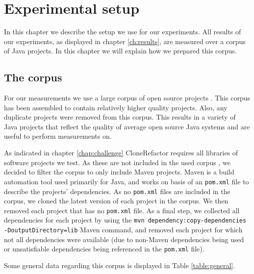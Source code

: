 \chapter{Experimental setup}
In this chapter we describe the setup we use for our experiments. All results of our experiments, as displayed in chapter \ref{ch:results}, are measured over a corpus of Java projects. In this chapter we will explain how we prepared this corpus.

\section{The corpus}\label{chap:corpus}
For our measurements we use a large corpus of open source projects \cite{githubCorpus2013}. This corpus has been assembled to contain relatively higher quality projects. Also, any duplicate projects were removed from this corpus. This results in a variety of Java projects that reflect the quality of average open source Java systems and are useful to perform measurements on.

As indicated in chapter \ref{chap:challenge} CloneRefactor requires all libraries of software projects we test. As these are not included in the used corpus \cite{githubCorpus2013}, we decided to filter the corpus to only include Maven projects. Maven is a build automation tool used primarily for Java, and works on basis of an \texttt{pom.xml} file to describe the projects' dependencies. As no \texttt{pom.xml} files are included in the corpus, we cloned the latest version of each project in the corpus. We then removed each project that has no \texttt{pom.xml} file. As a final step, we collected all dependencies for each project by using the \texttt{mvn dependency:copy-dependencies -DoutputDirectory=lib} Maven command, and removed each project for which not all dependencies were available (due to non-Maven dependencies being used or unsatisfiable dependencies being referenced in the \texttt{pom.xml} file).

Some general data regarding this corpus is displayed in Table \ref{table:general}.

